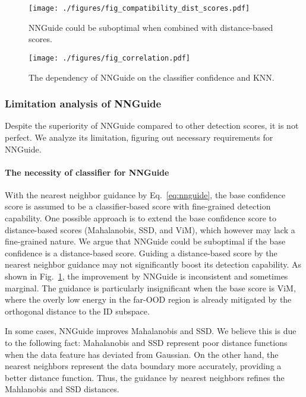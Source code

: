 \documentclass[10pt,twocolumn,letterpaper]{article}
\begin{document}
\begin{figure}[t]
\centering
\texttt{[image: ./figures/fig\_compatibility\_dist\_scores.pdf]}
\caption{
NNGuide could be suboptimal when combined with distance-based scores.
}
\label{fig:compatibility_dist_scores}
\end{figure}

\begin{figure}[t]
\centering
\texttt{[image: ./figures/fig\_correlation.pdf]}
\caption{
The dependency of NNGuide on the classifier confidence and KNN.
}
\label{fig:correlation}
\end{figure}


\subsubsection{Limitation analysis of NNGuide}
\label{sec:exp_ablation_limitation}
Despite the superiority of NNGuide compared to other detection scores, it is not perfect. We analyze its limitation, figuring out necessary requirements for NNGuide.

\paragraph{The necessity of classifier for NNGuide}
With the nearest neighbor guidance by Eq.~\eqref{eq:nnguide}, the base confidence score is assumed to be a classifier-based score with fine-grained detection capability. One possible approach is to extend the base confidence score to distance-based scores (\eg Mahalanobis, SSD, and ViM), which however may lack a fine-grained nature. We argue that NNGuide could be suboptimal if the base confidence is a distance-based score. Guiding a distance-based score by the nearest neighbor guidance may not significantly boost its detection capability. As shown in Fig.~\ref{fig:compatibility_dist_scores}, the improvement by NNGuide is inconsistent and sometimes marginal. The guidance is particularly insignificant when the base score is ViM, where the overly low energy in the far-OOD region is already mitigated by the orthogonal distance to the ID subspace. 

In some cases, NNGuide improves Mahalanobis and SSD. We believe this is due to the following fact: Mahalanobis and SSD represent poor distance functions when the data feature has deviated from Gaussian. On the other hand, the nearest neighbors represent the data boundary more accurately, providing a better distance function. Thus, the guidance by nearest neighbors refines the Mahlanobis and SSD distances.
\end{document}
